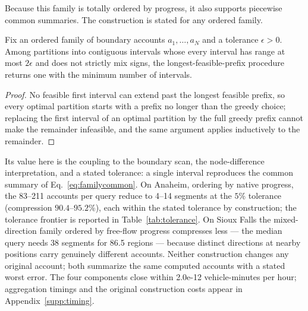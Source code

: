 Because this family is totally ordered by progress, it also supports
piecewise common summaries. The construction is stated for any ordered
family.
\begin{proposition}\label{prop:segmented}
Fix an ordered family of boundary accounts $a_1,\ldots,a_N$ and a
tolerance $\epsilon>0$. Among partitions into contiguous intervals
whose every interval has range at most $2\epsilon$ and does not
strictly mix signs, the longest-feasible-prefix procedure returns one
with the minimum number of intervals.
\end{proposition}
\begin{proof}
No feasible first interval can extend past the longest feasible prefix,
so every optimal partition starts with a prefix no longer than the
greedy choice; replacing the first interval of an optimal partition by
the full greedy prefix cannot make the remainder infeasible, and the
same argument applies inductively to the remainder.
\end{proof}
Its value here is the coupling to the boundary scan, the
node-difference interpretation, and a stated tolerance: a single
interval reproduces the common summary of Eq.~\eqref{eq:familycommon}.
On Anaheim, ordering by native progress, the 83--211 accounts per query
reduce to 4--14 segments at the $5\%$ tolerance (compression
$90.4$--$95.2\%$), each within the stated tolerance by construction;
the tolerance frontier is reported in Table~\ref{tab:tolerance}. On
Sioux Falls the mixed-direction family ordered by free-flow progress
compresses less --- the median query needs 38 segments for 86.5
regions --- because distinct directions at nearby positions carry
genuinely different accounts. Neither construction changes any original
account; both summarize the same computed accounts with a stated worst
error.
The four components close within 2.0e-12 vehicle-minutes per hour;
aggregation timings and the original construction costs appear in
Appendix~\ref{supp:timing}.
